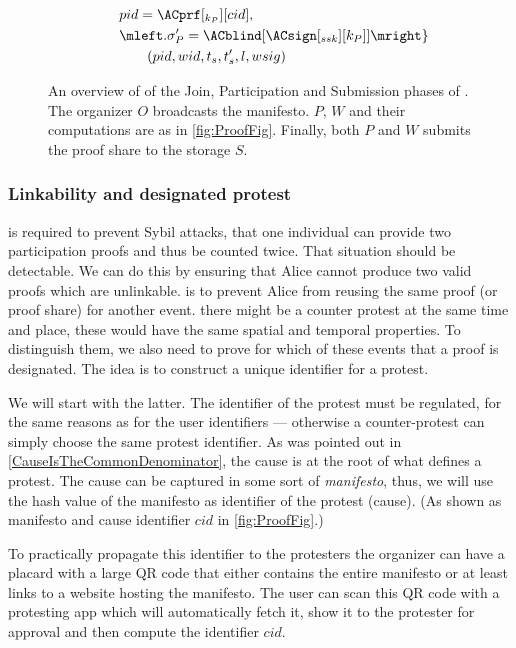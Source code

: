 \begin{figure}
\begin{minipage}{\linewidth}
\begin{align*}
        & \qquad pid = \ACprf[_{k_P}][cid], \\
        & \qquad \mleft. \sigma_P' = \ACblind[\ACsign[_{ssk}][k_P]] \mright\} \\
        & \qquad\qquad (pid, wid, t_s, t_s', l, wsig)
    \end{align*}
  \end{minipage}
  \caption{%
    An overview of of the Join, Participation and Submission phases of \PRIVO.\@
    The organizer \(O\) broadcasts the manifesto.
    \(P\), \(W\) and their computations are as in \cref{fig:ProofFig}.
    Finally, both \(P\) and \(W\) submits the proof share to the storage \(S\).
  }%
  \label{fig:ProtocolOverview}
\end{figure}

\subsubsection{Linkability and designated protest}

 is required to prevent Sybil attacks, \ie that one individual 
can provide two participation proofs and thus be counted twice.
That situation should be detectable.
We can do this by ensuring that Alice cannot produce two valid proofs which
are unlinkable.
 is to prevent Alice from reusing the same proof (or proof 
share) for another event.
\Eg there might be a counter protest at the same time and place, these would 
have the same spatial and temporal properties.
To distinguish them, we also need to prove for which of these events that a 
proof is designated.
The idea is to construct a unique identifier for a protest.

We will start with the latter.
The identifier of the protest must be regulated, for the same reasons as for the 
user identifiers --- otherwise a counter-protest can simply choose the same 
protest identifier.
As was pointed out in \cref{CauseIsTheCommonDenominator}, the cause is at the 
root of what defines a protest.
The cause can be captured in some sort of \emph{manifesto}, thus, we will use 
the hash value of the manifesto as identifier of the protest (cause).
(As shown as manifesto and cause identifier \(cid\) in \cref{fig:ProofFig}.)

To practically propagate this identifier to the protesters the organizer can 
have a placard with a large QR code that either contains the entire manifesto or 
at least links to a website hosting the manifesto.
The user can scan this QR code with a protesting app which will automatically 
fetch it, show it to the protester for approval and then compute the identifier 
\(cid\).

